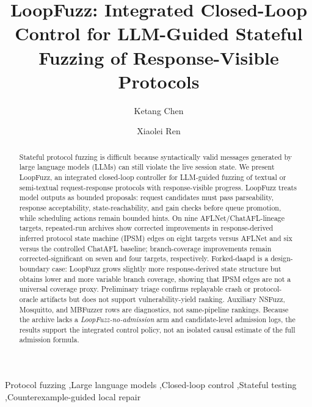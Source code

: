 \documentclass[final,5p,times,number]{elsarticle}
\begin{document}
\begin{frontmatter}

\title{LoopFuzz: Integrated Closed-Loop Control for LLM-Guided Stateful Fuzzing of Response-Visible Protocols}

\author[inst1]{Ketang Chen}
\author[inst1]{Xiaolei Ren}


\begin{abstract}
Stateful protocol fuzzing is difficult because syntactically valid messages generated by large language models (LLMs) can still violate the live session state. We present LoopFuzz, an integrated closed-loop controller for LLM-guided fuzzing of textual or semi-textual request-response protocols with response-visible progress. LoopFuzz treats model outputs as bounded proposals: request candidates must pass parseability, response acceptability, state-reachability, and gain checks before queue promotion, while scheduling actions remain bounded hints. On nine AFLNet/ChatAFL-lineage targets, repeated-run archives show corrected improvements in response-derived inferred protocol state machine (IPSM) edges on eight targets versus AFLNet and six versus the controlled ChatAFL baseline; branch-coverage improvements remain corrected-significant on seven and four targets, respectively. Forked-daapd is a design-boundary case: LoopFuzz grows slightly more response-derived state structure but obtains lower and more variable branch coverage, showing that IPSM edges are not a universal coverage proxy. Preliminary triage confirms replayable crash or protocol-oracle artifacts but does not support vulnerability-yield ranking. Auxiliary NSFuzz, Mosquitto, and MBFuzzer rows are diagnostics, not same-pipeline rankings. Because the archive lacks a \emph{LoopFuzz-no-admission} arm and candidate-level admission logs, the results support the integrated control policy, not an isolated causal estimate of the full admission formula.
\end{abstract}

\begin{keyword}
Protocol fuzzing \sep Large language models \sep Closed-loop control \sep Stateful testing \sep Counterexample-guided local repair
\end{keyword}

\end{frontmatter}
\small
\end{document}
